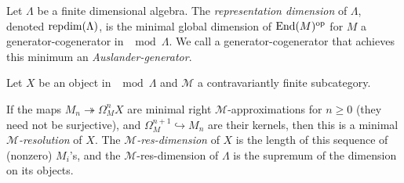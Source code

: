 
\begin{defn}
	Let $\Lambda$ be a finite dimensional algebra. The \emph{representation dimension} of $\Lambda$, denoted $\operatorname{repdim}(\Lambda)$, is the minimal global dimension of $\operatorname{End}(M)^{\operatorname{op}}$ for $M$ a generator-cogenerator in $\mod\Lambda$. We call a generator-cogenerator that achieves this minimum an \emph{Auslander-generator}.
\end{defn}

\begin{defn}
	Let $X$ be an object in $\mod\Lambda$ and $\mathcal M$ a contravariantly finite subcategory.
	\begin{center}
	\end{center}
	If the maps $M_n \twoheadrightarrow \Omega_M^nX$ are minimal right $\mathcal M$-approximations for $n\geq 0$ (they need not be surjective), and $\Omega_M^{n+1} \hookrightarrow M_n$ are their kernels, then this is a minimal \emph{$\mathcal M$-resolution} of $X$. The \emph{$\mathcal M$-res-dimension} of $X$ is the length of this sequence of (nonzero) $M_i$'s, and the $\mathcal M$-res-dimension of $\Lambda$ is the supremum of the dimension on its objects.
\end{defn}


